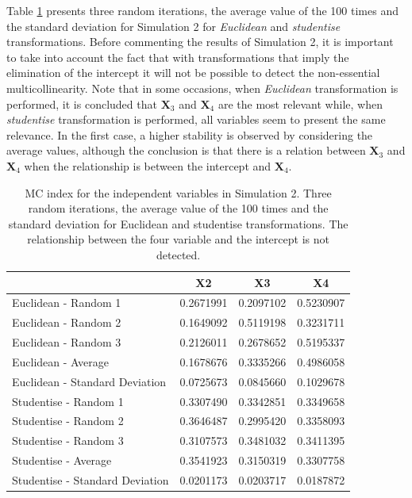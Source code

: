 Table \ref{tab:Simulation2randomlatex} presents three random iterations, the average value of the 100 times and the standard deviation for Simulation 2 for \emph{Euclidean} and \emph{studentise} transformations. Before commenting the results of Simulation 2, it is important to take into account the fact that with transformations that imply the elimination of the intercept it will not be possible to detect the non-essential multicollinearity.
Note that in some occasions, when \emph{Euclidean} transformation is performed, it is concluded that \(\mathbf{X}_{3}\) and \(\mathbf{X}_{4}\) are the most relevant while, when \emph{studentise} transformation is performed, all variables seem to present the same relevance. In the first case, a higher stability is observed by considering the average values, although the conclusion is that there is a relation between \(\mathbf{X}_{3}\) and \(\mathbf{X}_{4}\) when the relationship is between the intercept and \(\mathbf{X}_{4}\).

\begin{table}

\caption{\label{tab:Simulation2randomlatex}MC index for the independent variables in Simulation 2. Three random iterations, the average value of the 100 times and the standard deviation for Euclidean and studentise transformations. The relationship between the four variable and the intercept is not detected.}
\centering
\begin{tabular}[t]{l|c|c|c}
\hline
  & X2 & X3 & X4\\
\hline
Euclidean - Random 1 & 0.2671991 & 0.2097102 & 0.5230907\\
\hline
Euclidean - Random 2 & 0.1649092 & 0.5119198 & 0.3231711\\
\hline
Euclidean - Random 3 & 0.2126011 & 0.2678652 & 0.5195337\\
\hline
Euclidean - Average & 0.1678676 & 0.3335266 & 0.4986058\\
\hline
Euclidean - Standard Deviation & 0.0725673 & 0.0845660 & 0.1029678\\
\hline
Studentise - Random 1 & 0.3307490 & 0.3342851 & 0.3349658\\
\hline
Studentise - Random 2 & 0.3646487 & 0.2995420 & 0.3358093\\
\hline
Studentise - Random 3 & 0.3107573 & 0.3481032 & 0.3411395\\
\hline
Studentise - Average & 0.3541923 & 0.3150319 & 0.3307758\\
\hline
Studentise - Standard Deviation & 0.0201173 & 0.0203717 & 0.0187872\\
\hline
\end{tabular}
\end{table}

